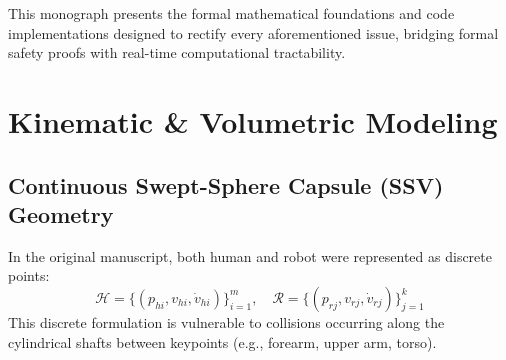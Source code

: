 \documentclass[10pt,twocolumn,a4paper]{article}
\begin{document}
This monograph presents the formal mathematical foundations and code implementations designed to rectify every aforementioned issue, bridging formal safety proofs with real-time computational tractability.

\section{Kinematic \& Volumetric Modeling}

\subsection{Continuous Swept-Sphere Capsule (SSV) Geometry}
In the original manuscript, both human and robot were represented as discrete points:
\begin{equation}
\mathcal{H} = \{(p_{hi}, v_{hi}, \dot{v}_{hi})\}_{i=1}^{m}, \quad \mathcal{R} = \{(p_{rj}, v_{rj}, \dot{v}_{rj})\}_{j=1}^{k}
\end{equation}
This discrete formulation is vulnerable to collisions occurring along the cylindrical shafts between keypoints (e.g., forearm, upper arm, torso). 
\end{document}
